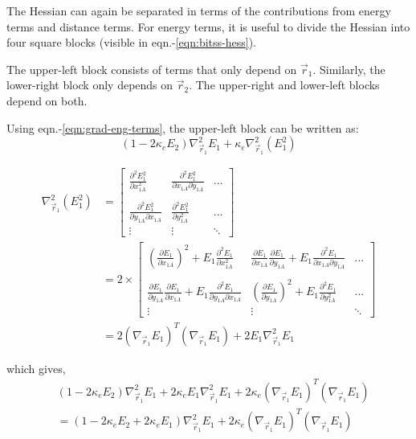 \documentclass[10pt]{article}
\begin{document}
The Hessian can again be separated in terms of the contributions from energy terms and distance terms. For energy terms, it is useful to divide the Hessian into four square blocks (visible in eqn.-\eqref{eqn:bitss-hess}).

The upper-left block consists of terms that only depend on $\vec{r}_1$. Similarly, the lower-right block only depends on $\vec{r}_2$. The upper-right and lower-left blocks depend on both.

Using eqn.-\eqref{eqn:grad-eng-terms}, the upper-left block can be written as:
$$(1-2\kappa_e E_2)\nabla_{\vec{r}_1}^2E_1 + \kappa_e \nabla^2_{\vec{r}_1}(E_1^2)$$

\begin{equation}
	\begin{split}
		\nabla_{\vec{r}_1}^2(E_1^2)  & =  \begin{bmatrix}
			\frac{\partial^2 E_1^2}{\partial x_{1A}^2} & \frac{\partial^2 E_1^2}{\partial x_{1A}\partial y_{1A}} & ... \\ \\
			\frac{\partial^2 E_1^2}{\partial y_{1A}\partial x_{1A}} & \frac{\partial^2 E_1^2}{\partial y_{1A}^2} & ... \\
			\vdots & \vdots & \ddots
		\end{bmatrix} \\
	    & =2 \times \begin{bmatrix}
	    	(\frac{\partial E_1}{\partial x_{1A}})^2 + E_1\frac{\partial^2 E_1}{\partial x_{1A}^2} & \frac{\partial E_1}{\partial x_{1A}}\frac{\partial E_1}{\partial y_{1A}} + E_1\frac{\partial^2 E_1}{\partial x_{1A}\partial y_{1A}} & ... \\ \\
	    	\frac{\partial E_1}{\partial y_{1A}}\frac{\partial E_1}{\partial x_{1A}} + E_1\frac{\partial^2 E_1}{\partial y_{1A}\partial x_{1A}} & (\frac{\partial E_1}{\partial y_{1A}})^2 + E_1\frac{\partial^2 E_1}{\partial y_{1A}^2} & ... \\
	    	\vdots & \vdots & \ddots
	    \end{bmatrix} \\
    	& = 2 (\nabla_{\vec{r}_1}E_1)^T(\nabla_{\vec{r}_1}E_1) + 2E_1 \nabla_{\vec{r}_1}^2E_1
	\end{split}
\end{equation}

which gives,
\begin{equation}
	\begin{split}
		& (1-2\kappa_e E_2)\nabla_{\vec{r}_1}^2E_1 + 2\kappa_e E_1\nabla^2_{\vec{r}_1}E_1 + 2\kappa_e(\nabla_{\vec{r}_1}E_1)^T(\nabla_{\vec{r}_1}E_1) \\
		& = (1-2\kappa_e E_2+2\kappa_e E_1)\nabla_{\vec{r}_1}^2E_1 + 2\kappa_e(\nabla_{\vec{r}_1}E_1)^T(\nabla_{\vec{r}_1}E_1)
	\end{split}
\end{equation}
\end{document}
